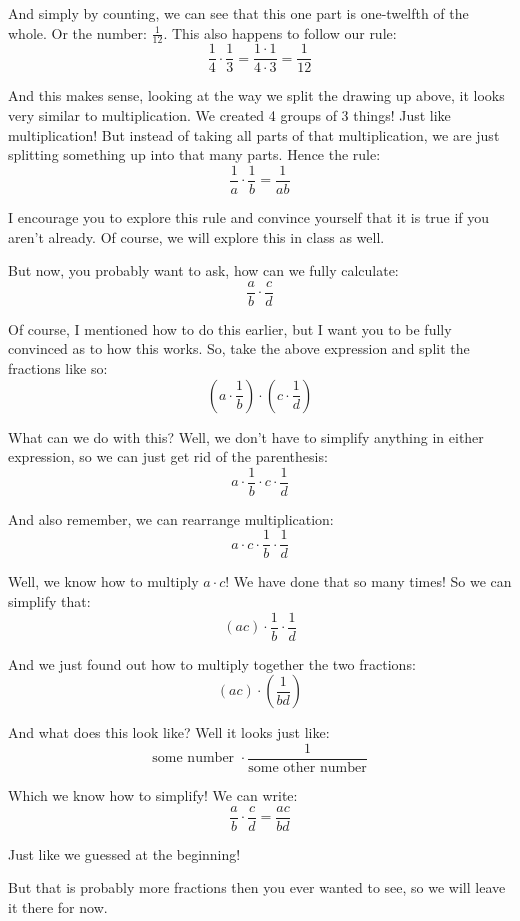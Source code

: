 \documentclass{article}
\begin{document}
And simply by counting, we can see that this one part is one-twelfth of the whole. Or the number: $\frac{1}{12}$. This also happens to follow our rule:
\[ \frac{1}{4} \cdot \frac{1}{3} = \frac{1\cdot 1}{4\cdot 3} = \frac{1}{12}  \]

And this makes sense, looking at the way we split the drawing up above, it looks very similar to multiplication. We created 4 groups of 3 things! Just like multiplication! 
But instead of taking all parts of that multiplication, we are just splitting something up into that many parts. Hence the rule: 
\[ \frac{1}{a} \cdot \frac{1}{b} = \frac{1}{ab}\]

I encourage you to explore this rule and convince yourself that it is true if you aren't already. Of course, we will explore this in class as well. 

But now, you probably want to ask, how can we fully calculate: 
\[ \frac{a}{b} \cdot \frac{c}{d} \]

Of course, I mentioned how to do this earlier, but I want you to be fully convinced as to how this works. So, take the above expression and split the fractions like so: 
\[ \left(a \cdot \frac{1}{b}\right) \cdot \left(c \cdot\frac{1}{d}\right) \]

What can we do with this? Well, we don't have to simplify anything in either expression, so we can just get rid of the parenthesis: 
\[ a \cdot \frac{1}{b} \cdot c \cdot \frac{1}{d} \]

And also remember, we can rearrange multiplication: 
\[ a \cdot c \cdot \frac{1}{b} \cdot \frac{1}{d} \]

Well, we know how to multiply $a \cdot c$! We have done that so many times! So we can simplify that: 
\[ \left(ac\right) \cdot \frac{1}{b} \cdot \frac{1}{d} \]

And we just found out how to multiply together the two fractions: 
\[ \left(ac\right) \cdot \left(\frac{1}{bd}\right) \]

And what does this look like? Well it looks just like: 
\[ \text{some number } \cdot \frac{1}{\text{some other number}} \]

Which we know how to simplify! We can write: 
\[ \frac{a}{b} \cdot \frac{c}{d} = \frac{ac}{bd} \]

Just like we guessed at the beginning! 

But that is probably more fractions then you ever wanted to see, so we will leave it there for now. 
\end{document}
